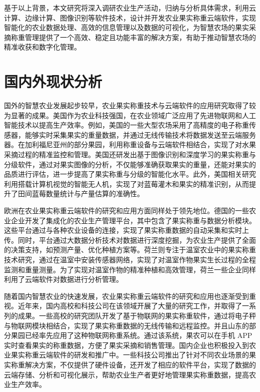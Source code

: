 基于以上背景，本文研究将深入调研农业生产活动，归纳与分析具体需求，利用云计算、边缘计算、图像识别等软件技术，设计并开发农业果实称重云端软件，实现智能化的农业数据处理、高效的信息管理以及数据的可视化，为智慧农场的果实采摘称重管理提供了一个高效、稳定且功能丰富的解决方案，有助于推动智慧农场的精准收获和数字化管理。 

\section{国内外现状分析}

国外的智慧农业发展起步较早，农业果实称重技术与云端软件的应用研究取得了较为显著的成果。美国作为农业科技强国，在农业领域广泛应用了先进物联网和人工智能技术以提高生产效率\cite{赵春江2021智慧农业的发展现状与未来展望}。例如，美国的一些大型农场采用了高精度的电子称重传感器，能够实时采集果实的重量数据，并通过无线传输技术将数据发送至云端服务器\cite{陈学庚2020农业机械与信息技术融合发展现状与方向}。在加利福尼亚州的部分果园，利用称重设备与云端软件相结合，实现了对水果采摘过程的精准监控和管理\cite{Ampatzidis2011}。美国还研发出基于图像识别和深度学习的果实称重与分级软件，通过对果实图像的分析\cite{Anisha2019FruitRU}，不仅能够准确获取果实的重量，还能对果实的品质进行评估，进一步提高了果实称重与分级的智能化水平。此外，美国相关研究利用搭载计算机视觉的智能无人机，实现了对蓝莓灌木和果实的精准识别，从而提升了田间蓝莓数量统计与产量估算的准确性\cite{nguyen2025accuratecropyieldestimation}。

欧洲在农业果实称重云端软件的研究和应用方面同样处于领先地位。德国的一些农业企业开发了集成化的农业生产管理平台，其中包含了果实称重与数据分析模块\cite{Yin2020}。这些平台通过与各种农业设备的连接，实现了果实称重数据的自动采集和实时上传。同时，平台通过大数据分析技术对数据进行深度挖掘，为农业生产提供了全面的决策支持，如预测产量、优化种植方案等\cite{Phate2021}。荷兰则专注于温室农业中的果实称重技术研究，通过在温室中安装传感器网络，实现了对温室作物果实生长过程的全程监测和重量测量\cite{Graaf2004}。为了实现对温室作物的精准种植和高效管理，荷兰一些企业同样利用了云端软件对数据进行分析管理。

随着国内智慧农业的快速发展，农业果实称重云端软件的研究和应用也逐渐受到重视。近年来，国内高校和科技公司在该领域开展了大量的研究工作，并取得了一系列的成果。一些高校的研究团队开发了基于物联网的果实称重软件，通过将电子秤与物联网模块相结合，实现了果实称重数据的无线传输和远程监控\cite{Zhu2013}。并且山东的部分果园已经率先应用了这种物联网称重系统。通过该系统，果农可以在手机 APP 实时查看果实的称重数据，方便了果实采摘和销售管理\cite{Gao2023}。国内企业也积极投入到农业果实称重云端软件的研发和推广中。一些科技公司推出了针对不同农业场景的果实称重解决方案\cite{Ningbo2019}，不仅提供了硬件设备，还开发了相应的软件平台，实现了数据的云端存储、分析和可视化展示，帮助农业生产者更好地管理果实称重数据，提高农业生产效率。

